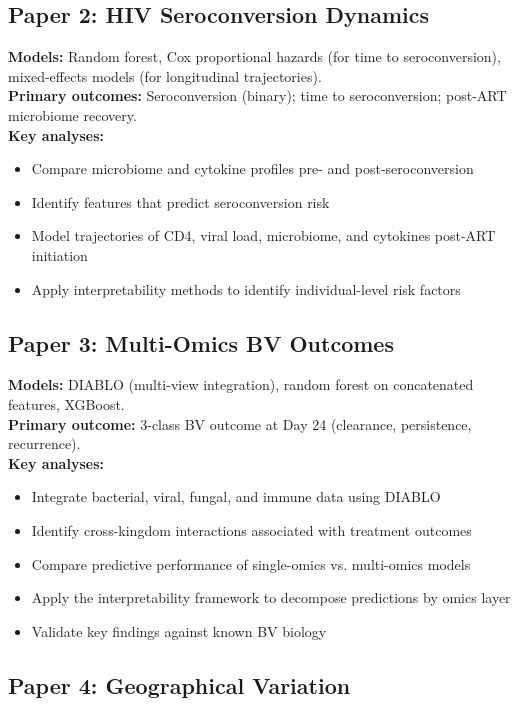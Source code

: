 \documentclass[12pt,a4paper]{report}
\begin{document}
\subsection{Paper 2: HIV Seroconversion Dynamics}

\textbf{Models:} Random forest, Cox proportional hazards (for time to seroconversion), mixed-effects models (for longitudinal trajectories).\\
\textbf{Primary outcomes:} Seroconversion (binary); time to seroconversion; post-ART microbiome recovery.\\
\textbf{Key analyses:}
\begin{itemize}
    \item Compare microbiome and cytokine profiles pre- and post-seroconversion
    \item Identify features that predict seroconversion risk
    \item Model trajectories of CD4, viral load, microbiome, and cytokines post-ART initiation
    \item Apply interpretability methods to identify individual-level risk factors
\end{itemize}

\subsection{Paper 3: Multi-Omics BV Outcomes}

\textbf{Models:} DIABLO (multi-view integration), random forest on concatenated features, XGBoost.\\
\textbf{Primary outcome:} 3-class BV outcome at Day 24 (clearance, persistence, recurrence).\\
\textbf{Key analyses:}
\begin{itemize}
    \item Integrate bacterial, viral, fungal, and immune data using DIABLO
    \item Identify cross-kingdom interactions associated with treatment outcomes
    \item Compare predictive performance of single-omics vs. multi-omics models
    \item Apply the interpretability framework to decompose predictions by omics layer
    \item Validate key findings against known BV biology
\end{itemize}

\subsection{Paper 4: Geographical Variation}
\end{document}
